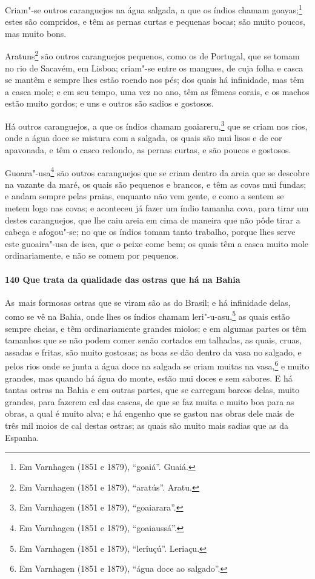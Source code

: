 Criam"-se outros caranguejos na água salgada, a que os índios chamam goayas;\footnote{ Em
Varnhagen (1851 e 1879), ``goaiá''. Guaiá.} estes são compridos, e têm as pernas curtas e
pequenas bocas; são muito poucos, mas muito bons.

Aratuns\footnote{ Em Varnhagen (1851 e 1879), ``aratús''. Aratu.} são outros caranguejos
pequenos, como os de Portugal, que se tomam no rio de Sacavém, em Lisboa; criam"-se entre
os mangues, de cuja folha e casca se mantêm e sempre lhes estão roendo nos pés; dos quais
há infinidade, mas têm a casca mole; e em seu tempo, uma vez no ano, têm as fêmeas corais,
e os machos estão muito gordos; e uns e outros são sadios e gostosos.

Há outros caranguejos, a que os índios chamam goaiareru,\footnote{ Em Varnhagen (1851 e
1879), ``goaiarara''.} que se criam nos rios, onde a água doce se mistura com a salgada,
os quais são mui lisos e de cor apavonada, e têm o casco redondo, as pernas curtas, e são
poucos e gostosos.

Guoara"-usa\footnote{ Em Varnhagen (1851 e 1879), ``goaiaussá''.} são outros caranguejos
que se criam dentro da areia que se descobre na vazante da maré, os quais são pequenos e
brancos, e têm as covas mui fundas; e andam sempre pelas praias, enquanto não vem gente, e
como a sentem se metem logo nas covas; e aconteceu já fazer um índio tamanha cova, para
tirar um destes caranguejos, que lhe caiu areia em cima de maneira que não pôde tirar a
cabeça e afogou"-se; no que os índios tomam tanto trabalho, porque lhes serve este
guoaira"-usa de isca, que o peixe come bem; os quais têm a casca muito mole ordinariamente,
e não se comem por pequenos.

\paragraph{140 Que trata da qualidade das ostras que há na Bahia}

\mbox{As mais} formosas ostras que se viram são as do Brasil; e há infinidade delas, como se vê
na Bahia, onde lhes os índios chamam leri"-u-asu,\footnote{ Em Varnhagen (1851 e 1879),
``lerîuçú''. Leriaçu.} as quais estão sempre cheias, e têm ordinariamente grandes miolos;
e em algumas partes os têm tamanhos que se não podem comer senão cortados em talhadas, as
quais, cruas, assadas e fritas, são muito gostosas; as boas se dão dentro da vasa no
salgado, e pelos rios onde se junta a água doce na salgada se criam muitas na
vasa,\footnote{ Em Varnhagen (1851 e 1879), ``água doce ao salgado''.} e muito grandes,
mas quando há água do monte, estão mui doces e sem sabores. E há tantas ostras na Bahia e
em outras partes, que se carregam barcos delas, muito grandes, para fazerem cal das
cascas, de que se faz muita e muito boa para as obras, a qual é muito alva; e há engenho
que se gastou nas obras dele mais de três mil moios de cal destas ostras; as quais são
muito mais sadias que as da Espanha.

